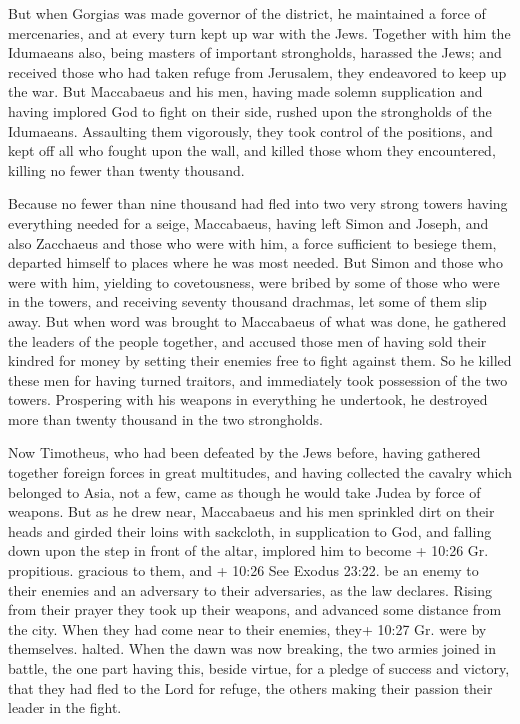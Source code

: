  But when Gorgias was made governor of the district, he
maintained a force of mercenaries, and at every turn kept up war with
the Jews.  Together with him the Idumaeans also, being
masters of important strongholds, harassed the Jews; and received those
who had taken refuge from Jerusalem, they endeavored to keep up the war.
 But Maccabaeus and his men, having made solemn
supplication and having implored God to fight on their side, rushed upon
the strongholds of the Idumaeans.  Assaulting them
vigorously, they took control of the positions, and kept off all who
fought upon the wall, and killed those whom they encountered, killing no
fewer than twenty thousand.

 Because no fewer than nine thousand had fled into two very
strong towers having everything needed for a seige, 
Maccabaeus, having left Simon and Joseph, and also Zacchaeus and those
who were with him, a force sufficient to besiege them, departed himself
to places where he was most needed.  But Simon and those
who were with him, yielding to covetousness, were bribed by some of
those who were in the towers, and receiving seventy thousand drachmas,
let some of them slip away.  But when word was brought to
Maccabaeus of what was done, he gathered the leaders of the people
together, and accused those men of having sold their kindred for money
by setting their enemies free to fight against them.  So he
killed these men for having turned traitors, and immediately took
possession of the two towers.  Prospering with his weapons
in everything he undertook, he destroyed more than twenty thousand in
the two strongholds.

 Now Timotheus, who had been defeated by the Jews before,
having gathered together foreign forces in great multitudes, and having
collected the cavalry which belonged to Asia, not a few, came as though
he would take Judea by force of weapons.  But as he drew
near, Maccabaeus and his men sprinkled dirt on their heads and girded
their loins with sackcloth, in supplication to God,  and
falling down upon the step in front of the altar, implored him to become
+ 10:26 Gr. propitious. gracious to them, and + 10:26 See Exodus 23:22.
be an enemy to their enemies and an adversary to their adversaries, as
the law declares.  Rising from their prayer they took up
their weapons, and advanced some distance from the city. When they had
come near to their enemies, they+ 10:27 Gr. were by themselves. halted.
 When the dawn was now breaking, the two armies joined in
battle, the one part having this, beside virtue, for a pledge of success
and victory, that they had fled to the Lord for refuge, the others
making their passion their leader in the fight.

